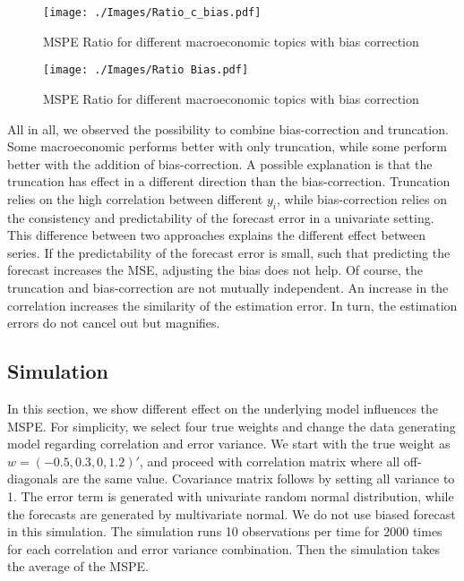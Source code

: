 \documentclass[11pt]{article}
\begin{document}
\begin{figure}[!h]
	\centering
	\texttt{[image: ./Images/Ratio\_c\_bias.pdf]}
	\caption{MSPE Ratio for different macroeconomic topics with bias correction}\label{fig: Ratio bias}
\end{figure}


\begin{figure}[!h]
	\centering
	\texttt{[image: ./Images/Ratio Bias.pdf]}
	\caption{MSPE Ratio for different macroeconomic topics with bias correction}\label{fig: Ratio bias}
\end{figure}


All in all, we observed the possibility to combine bias-correction and truncation. Some macroeconomic performs better with only truncation, while some perform better with the addition of bias-correction. A possible explanation is that the truncation has effect in a different direction than the bias-correction. Truncation relies on the high correlation between different $y_i$, while bias-correction relies on the consistency and predictability of the forecast error in a univariate setting. This difference between two approaches explains the different effect between series. If the predictability of the forecast error is small, such that predicting the forecast increases the MSE, adjusting the bias does not help. Of course, the truncation and bias-correction are not mutually independent. An increase in the correlation increases the similarity of the estimation error. In turn, the estimation errors do not cancel out but magnifies. 



\subsection{Simulation}\label{simulation}
In this section, we show different effect on the underlying model influences the MSPE. For simplicity, we select four true weights and change the data generating model regarding correlation and error variance. We start with the true weight as $w=(-0.5,0.3,0,1.2)'$, and proceed with correlation matrix where all off-diagonals are the same value. Covariance matrix follows by setting all variance to 1. The error term is generated with univariate random normal distribution, while the forecasts are generated by multivariate normal. We do not use biased forecast in this simulation. The simulation runs 10 observations per time for 2000 times for each correlation and error variance combination. Then the simulation takes the average of the MSPE.
\end{document}
